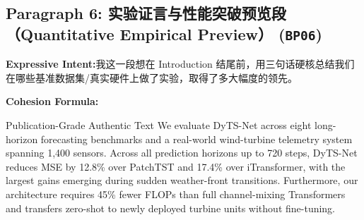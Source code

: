 \subsection*{Paragraph 6: 实验证言与性能突破预览段（Quantitative Empirical Preview） (\texttt{BP06})}
\noindent\textbf{Expressive Intent:}\enspace 我这一段想在 Introduction 结尾前，用三句话硬核总结我们在哪些基准数据集/真实硬件上做了实验，取得了多大幅度的领先。\par
\noindent\textbf{Cohesion Formula:}\par\vspace{4pt}
\begin{ExampleBox}{Publication-Grade Authentic Text}
We evaluate DyTS-Net across eight long-horizon forecasting benchmarks and a real-world wind-turbine telemetry system spanning 1,400 sensors. Across all prediction horizons up to 720 steps, DyTS-Net reduces MSE by 12.8\% over PatchTST and 17.4\% over iTransformer, with the largest gains emerging during sudden weather-front transitions. Furthermore, our architecture requires 45\% fewer FLOPs than full channel-mixing Transformers and transfers zero-shot to newly deployed turbine units without fine-tuning.
\end{ExampleBox}
